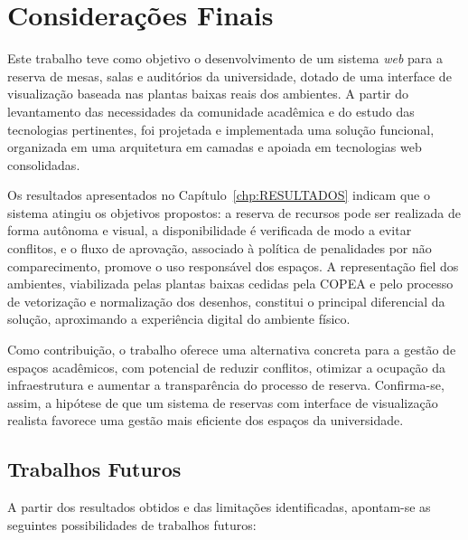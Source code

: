 \chapter{Considerações Finais}\label{chp:CONCLUSAO}

Este trabalho teve como objetivo o desenvolvimento de um sistema \textit{web} para a reserva de mesas, salas e auditórios da universidade, dotado de uma interface de visualização baseada nas plantas baixas reais dos ambientes. A partir do levantamento das necessidades da comunidade acadêmica e do estudo das tecnologias pertinentes, foi projetada e implementada uma solução funcional, organizada em uma arquitetura em camadas e apoiada em tecnologias web consolidadas.

Os resultados apresentados no Capítulo~\ref{chp:RESULTADOS} indicam que o sistema atingiu os objetivos propostos: a reserva de recursos pode ser realizada de forma autônoma e visual, a disponibilidade é verificada de modo a evitar conflitos, e o fluxo de aprovação, associado à política de penalidades por não comparecimento, promove o uso responsável dos espaços. A representação fiel dos ambientes, viabilizada pelas plantas baixas cedidas pela COPEA e pelo processo de vetorização e normalização dos desenhos, constitui o principal diferencial da solução, aproximando a experiência digital do ambiente físico.

Como contribuição, o trabalho oferece uma alternativa concreta para a gestão de espaços acadêmicos, com potencial de reduzir conflitos, otimizar a ocupação da infraestrutura e aumentar a transparência do processo de reserva. Confirma-se, assim, a hipótese de que um sistema de reservas com interface de visualização realista favorece uma gestão mais eficiente dos espaços da universidade.

\section{Trabalhos Futuros}\label{sec:trab_futuros}

A partir dos resultados obtidos e das limitações identificadas, apontam-se as seguintes possibilidades de trabalhos futuros:

